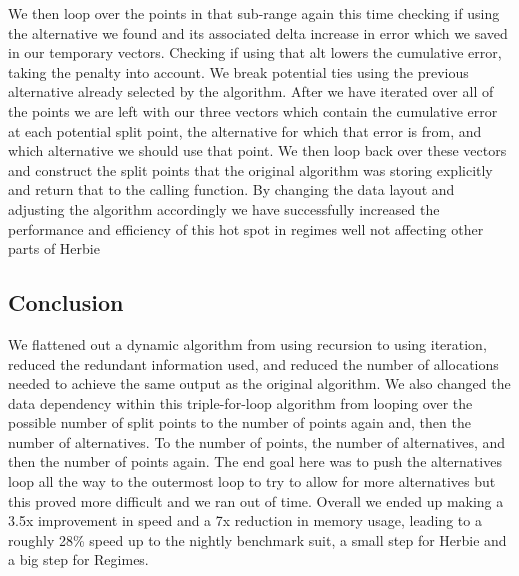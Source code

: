 \documentclass{article}
\begin{document}
We then loop over the points in that sub-range again this time checking if using the alternative we found and its associated delta increase in error which we saved in our temporary vectors. Checking if using that alt lowers the cumulative error, taking the penalty into account. We break potential ties using the previous alternative already selected by the algorithm. After we have iterated over all of the points we are left with our three vectors which contain the cumulative error at each potential split point, the alternative for which that error is from, and which alternative we should use that point. We then loop back over these vectors and construct the split points that the original algorithm was storing explicitly and return that to the calling function. By changing the data layout and adjusting the algorithm accordingly we have successfully increased the performance and efficiency of this hot spot in regimes well not affecting other parts of Herbie

\subsection{Conclusion}

We flattened out a dynamic algorithm from using recursion to using iteration, reduced the redundant information used, and reduced the number of allocations needed to achieve the same output as the original algorithm. We also changed the data dependency within this triple-for-loop algorithm from looping over the possible number of split points to the number of points again and, then the number of alternatives. To the number of points, the number of alternatives, and then the number of points again. The end goal here was to push the alternatives loop all the way to the outermost loop to try to allow for more alternatives but this proved more difficult and we ran out of time. 
Overall we ended up making a 3.5x improvement in speed and a 7x reduction in memory usage, leading to a roughly 28\% speed up to the nightly benchmark suit, a small step for Herbie and a big step for Regimes.
 
\end{document}
